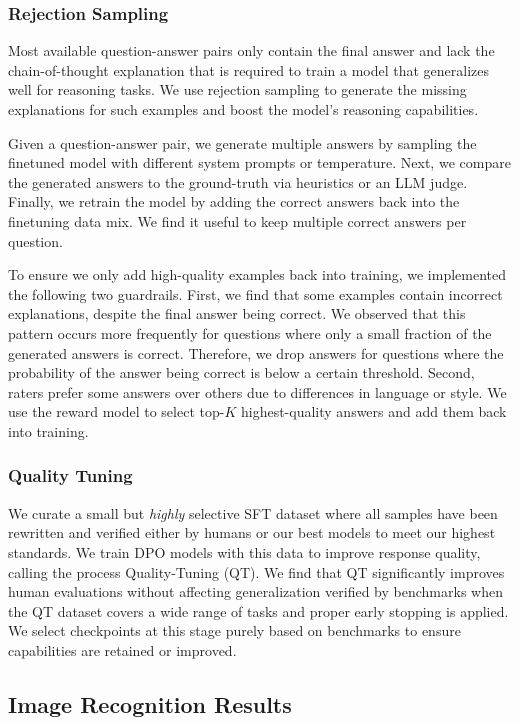 \documentclass[dvipsnames]{fairmeta}
\begin{document}
\subsubsection{Rejection Sampling}
\label{subsubsection:vision_rejection_sampling}
Most available question-answer pairs only contain the final answer and lack the chain-of-thought explanation that is required to train a model that generalizes well for reasoning tasks.
We use rejection sampling to generate the missing explanations for such examples and boost the model's reasoning capabilities.

Given a question-answer pair, we generate multiple answers by sampling the finetuned model with different system prompts or temperature.
Next, we compare the generated answers to the ground-truth via heuristics or an LLM judge.
Finally, we retrain the model by adding the correct answers back into the finetuning data mix. We find it useful to keep multiple correct answers per question.

To ensure we only add high-quality examples back into training, we implemented the following two guardrails.
First, we find that some examples contain incorrect explanations, despite the final answer being correct.
We observed that this pattern occurs more frequently for questions where only a small fraction of the generated answers is correct.
Therefore, we drop answers for questions where the probability of the answer being correct is below a certain threshold.
Second, raters prefer some answers over others due to differences in language or style.
We use the reward model to select top-$K$ highest-quality answers and add them back into training.

\subsubsection{Quality Tuning}
\label{subsubsection:vision_quality_tuning}
We curate a small but \emph{highly} selective SFT dataset where all samples have been rewritten and verified either by humans or our best models to meet our highest standards. We train DPO models with this data to improve response quality, calling the process Quality-Tuning (QT). We find that QT significantly improves human evaluations without affecting generalization verified by benchmarks when the QT dataset covers a wide range of tasks and proper early stopping is applied. We select checkpoints at this stage purely based on benchmarks to ensure capabilities are retained or improved.

\subsection{Image Recognition Results}
\label{section:results_image_recognition}
\end{document}

